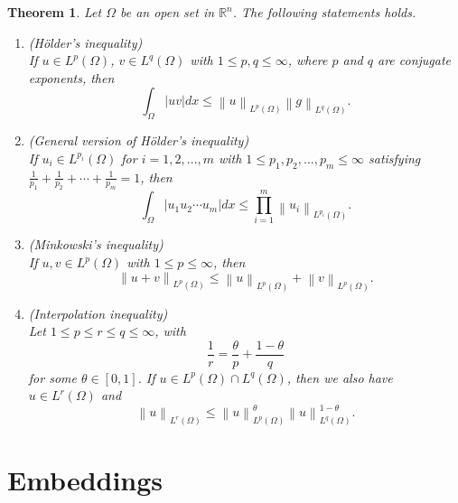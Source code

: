 \documentclass[11pt,a4paper]{report}
\newtheorem{theorem}{Theorem}[section]
\theoremstyle{definition}
\begin{document}
\begin{theorem}
	Let $\Omega$ be an open set in $\mathbb{R}^{n}$.
	The following statements holds.
	\begin{enumerate}[label=(\alph*)] 
		\rm\item (H\"{o}lder's inequality) \\[0.1cm]
		If $u \in L^p(\Omega)$, $v \in L^q(\Omega)$ with $1 \leq p, q \leq \infty$, where $p$ and $q$ are conjugate exponents, then 
		\begin{equation*} 
			\int_{\Omega} |uv|dx \leq \left\| u \right\|_{L^p(\Omega)} \left\| g \right\|_{L^q(\Omega)}.
		\end{equation*}
		\rm\item (General version of H\"{o}lder's inequality) \\[0.1cm]
		If $u_i \in L^{p_i}(\Omega)$ for $i = 1, 2, \ldots, m$ with $1 \leq p_1, p_2, \ldots, p_m \leq \infty$ satisfying $\frac{1}{p_1} + \frac{1}{p_2} + \cdots + \frac{1}{p_m} = 1$, then 
		\begin{equation*} 
			\int_{\Omega} |u_1 u_2 \cdots u_m |dx \leq \prod_{i=1}^m \left\| u_i \right\|_{L^{p_i}(\Omega)}.
		\end{equation*}
		\rm\item (Minkowski's inequality)\\[0.1cm]
		If $u, v \in L^p(\Omega)$ with $1 \leq p  \leq \infty$, then 
		\begin{equation*} 
			\left\| u + v\right\|_{L^p(\Omega)} \leq \left\| u \right\|_{L^p(\Omega)} + \left\| v \right\|_{L^p(\Omega)}.
		\end{equation*}
		\rm\item (Interpolation inequality)\\[0.1cm]
		Let $1 \leq p \leq r \leq q \leq \infty$, with 
		\begin{equation*} 
			\frac{1}{r} = \frac{\theta}{p} + \frac{1 - \theta}{q}
		\end{equation*}
		for some $\theta \in [0, 1]$.
		If $u \in L^p(\Omega) \cap L^q(\Omega)$, then we also have $u \in L^r(\Omega)$ and 
		\begin{equation*} 
			\left\| u \right\|_{L^r(\Omega)} \leq \left\| u \right\|^{\theta}_{L^p(\Omega)} \left\| u \right\|^{1 - \theta}_{L^q(\Omega)}.
		\end{equation*}
	\end{enumerate}
\end{theorem}


\chapter{Embeddings}
\end{document}

